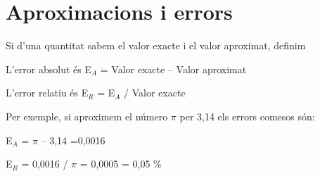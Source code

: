 \pagebreak

\section{Aproximacions i errors}
 
\begin{theorybox}
Si d'una quantitat sabem el valor exacte i el valor aproximat, definim

L'error absolut és E${}_{A}$ = {\textbar}Valor exacte -- Valor aproximat{\textbar}

L'error relatiu és E${}_{R}$ = E${}_{A}$ / Valor exacte

Per exemple, si aproximem el número $\pi$ per 3,14 els errors comesos són:

E${}_{A}$ = {\textbar}$\pi$ -- 3,14{\textbar} =0,0016

E${}_{R}$ = 0,0016 / $\pi$ = 0,0005    =    0,05 \%

\end{theorybox}

